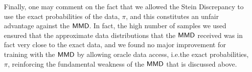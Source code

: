 Finally, one may comment on the fact that we allowed the Stein Discrepancy to use the exact probabilities of the data, $\pi$, and this constitutes an unfair advantage against the $\operatorname{\textsf{MMD}}$. In fact, the high number of samples we used ensured that the approximate data distributions that the $\operatorname{\textsf{MMD}}$ received was in fact very close to the exact data, and we found no major improvement for training with the $\operatorname{\textsf{MMD}}$ by allowing oracle data access, i.e.\@ the exact probabilities, $\pi$, reinforcing the fundamental weakness of the $\operatorname{\textsf{MMD}}$ that is discussed above.  
\begin{figure}[ht]
    \centering

\end{figure}
